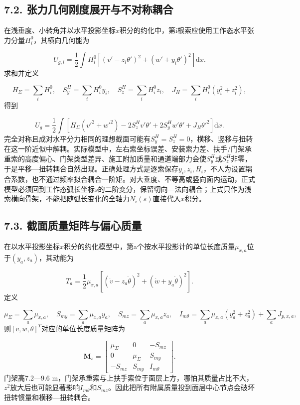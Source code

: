 \documentclass[UTF8,a4paper,11pt,fontset=none]{ctexart}
\begin{document}
\subsection*{7.2. 张力几何刚度展开与不对称耦合}
在浅垂度、小转角并以水平投影坐标\(x\)\allowbreak{}积分的约化中，第i根索应使用工作态水平张力分量\(H_i^0\)\allowbreak{}，其横向几何能为\par
\[
U_{g,i}=\frac12\int H_i^0
\left[
\left(v'-z_i\theta'\right)^2
+
\left(w'+y_i\theta'\right)^2
\right]\mathrm dx.
\]
求和并定义\par
\[
H_\Sigma=\sum_iH_i^0,
\quad
S_y^{H}=\sum_iH_i^0y_i,
\quad
S_z^{H}=\sum_iH_i^0z_i,
\quad
J_H=\sum_iH_i^0(y_i^2+z_i^2),
\]
得到\par
\[
U_g=\frac12\int
\left[
H_\Sigma(v'^2+w'^2)
-2S_z^{H}v'\theta'
+2S_y^{H}w'\theta'
+J_H\theta'^2
\right]\mathrm dx.
\]
完全对称且成对水平分力相同的理想截面可能有\(S_y^{H}=S_z^{H}=0\)\allowbreak{}，横移、竖移与扭转在这一阶近似中解耦。实际模型中，左右索坐标误差、安装索力差、扶手/门架承重索的高度偏心、门架类型差异、施工附加质量和通道端部力会使\(S_y^{H}\)\allowbreak{}或\(S_z^{H}\)\allowbreak{}非零，于是平移—扭转耦合自然出现。正确处理方式是逐索保存\(y_i,\allowbreak z_i,\allowbreak H_i\)\allowbreak{}，不人为设置耦合系数，也不通过频率拟合耦合一阶矩。对大垂度、不等高或竖向面内运动，正式模型必须回到工作态弧长坐标\(s\)\allowbreak{}的二阶变分，保留切向—法向耦合；上式只作为浅索横向骨架，不能把随弧长变化的全轴力\(N_i(s)\)\allowbreak{}直接代入\(x\)\allowbreak{}积分。\par
{}
\subsection*{7.3. 截面质量矩阵与偏心质量}
在以水平投影坐标\(x\)\allowbreak{}积分的约化模型中，第a个按水平投影计的单位长度质量\(\mu_{x,\allowbreak a}\)\allowbreak{}位于\((y_a,\allowbreak z_a)\)\allowbreak{}，其动能为\par
\[
T_a=\frac12\mu_{x,a}
\left[
(\dot v-z_a\dot\theta)^2
+(\dot w+y_a\dot\theta)^2
\right].
\]
定义\par
\[
\mu_\Sigma=\sum_a\mu_{x,a},
\quad
S_{my}=\sum_a\mu_{x,a}y_a,
\quad
S_{mz}=\sum_a\mu_{x,a}z_a,
\quad
I_{m\theta}=\sum_a\mu_{x,a}(y_a^2+z_a^2)+\sum_aJ_{p,x,a},
\]
则\([v,\allowbreak w,\allowbreak \theta]^T\)\allowbreak{}对应的单位长度质量矩阵为\par
\[
\mathbf M_s=
\begin{bmatrix}
\mu_\Sigma&0&-S_{mz}\\
0&\mu_\Sigma&S_{my}\\
-S_{mz}&S_{my}&I_{m\theta}
\end{bmatrix}.
\]
门架高7.2—9.6 m，门架承重索与上扶手索位于面层上方，哪怕其质量占比不大，\(z^2\)\allowbreak{}放大后也可能显著影响\(I_{m\theta}\)\allowbreak{}和\(S_{mz}\)\allowbreak{}。因此把所有附属质量投到面层中心节点会破坏扭转惯量和横移—扭转耦合。\par
{}
\end{document}
